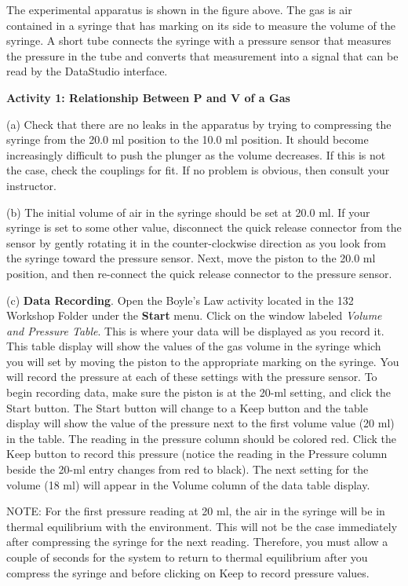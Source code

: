 The experimental apparatus is shown in the figure above. The gas is air contained
in a syringe that has marking on its side to measure the volume of the syringe.
A short tube connects the syringe with a pressure sensor that measures the pressure
in the tube and converts that measurement into a signal that can be read by
the DataStudio interface.

\textbf{Activity 1: Relationship Between P and V of a Gas}

(a) Check that there are no leaks in the apparatus by trying to compressing
the syringe from the 20.0 ml position to the 10.0 ml position. It should become
increasingly difficult to push the plunger as the volume decreases. If this
is not the case, check the couplings for fit. If no problem is obvious, then
consult your instructor. 
\vspace{20mm}

(b) The initial volume of air in the syringe should be set at 20.0 ml. If your
syringe is set to some other value, disconnect the quick release connector from
the sensor by gently rotating it in the counter-clockwise direction as you look
from the syringe toward the pressure sensor. Next, move the piston to the 20.0
ml position, and then re-connect the quick release connector to the pressure
sensor. 

(c) \textbf{Data Recording}. Open the Boyle's Law activity located in the 132
Workshop Folder under the {\bf Start} menu. Click on the window labeled \textit{Volume
and Pressure Table}. This is where your data will be displayed as you record
it. This table display will show the values of the gas volume in the syringe
which you will set by moving the piston to the appropriate marking on the syringe.
You will record the pressure at each of these settings with the pressure sensor.
To begin recording data, make sure the piston is at the 20-ml setting, and click
the Start button. The Start button will change to a Keep button and the table
display will show the value of the pressure next to the first volume value (20
ml) in the table. The reading in the pressure column should be colored red.
Click the Keep button to record this pressure (notice the reading in the Pressure
column beside the 20-ml entry changes from red to black). The next setting for
the volume (18 ml) will appear in the Volume column of the data table display.

NOTE: For the first pressure reading at 20 ml, the air in the syringe will be
in thermal equilibrium with the environment. This will not be the case immediately
after compressing the syringe for the next reading. Therefore, you must allow
a couple of seconds for the system to return to thermal equilibrium after you 
compress the syringe and before clicking on Keep to record pressure values. 

